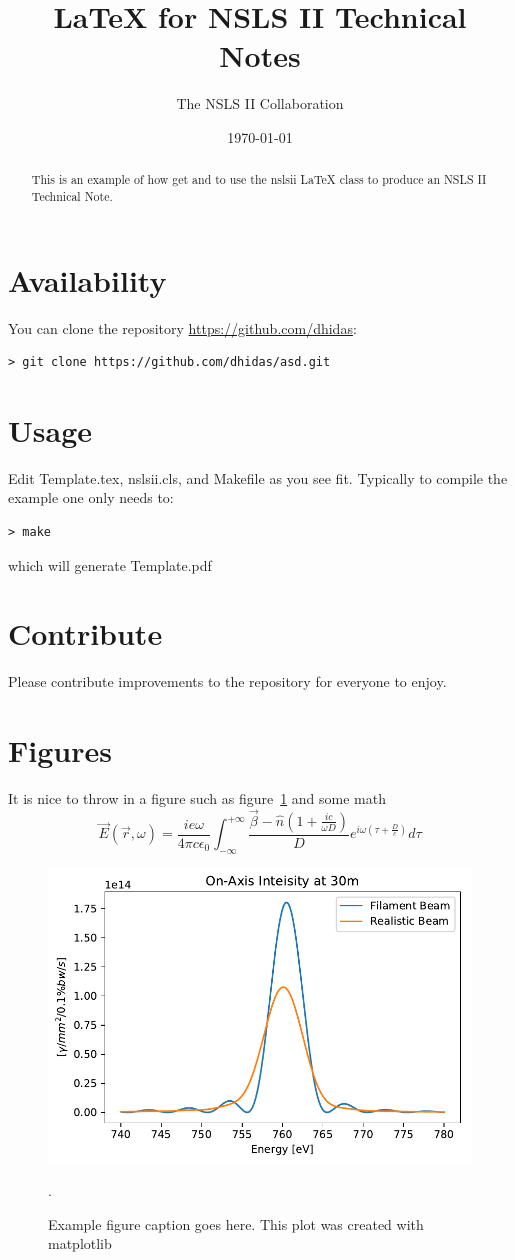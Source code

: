 \documentclass{nslsii}
\title{\LaTeX{}  for NSLS II Technical Notes}
\author{The NSLS II Collaboration}
\date{\today}
\begin{document}
\maketitle

\begin{abstract}
This is an example of how get and to use the nslsii \LaTeX{} class to produce an NSLS II Technical Note.
\end{abstract}



\section{Availability}
You can clone the repository \href{https://github.com/dhidas}{https://github.com/dhidas}:
\begin{verbatim}
> git clone https://github.com/dhidas/asd.git
\end{verbatim}

\section{Usage}
Edit Template.tex, nslsii.cls, and Makefile as you see fit.  Typically to compile the example one only needs to:
\begin{verbatim}
> make
\end{verbatim}
which will generate Template.pdf


\section{Contribute}
Please contribute improvements to the repository for everyone to enjoy.


\section{Figures}
It is nice to throw in a figure such as figure~\ref{fig:example} and some math
$$
\vec E(\vec r, \omega) = \frac{ie\omega}{4 \pi c \epsilon_0} \int_{-\infty}^{+\infty} \frac{\vec \beta - \hat n (1 + \frac{i c}{ \omega D})}{D} e^{i \omega ( \tau + \frac{D}{c} )} d\tau
$$

\begin{figure}
\centering
\includegraphics[width=0.5\columnwidth]{img/spectra}
\caption{Example figure caption goes here.  This plot was created with matplotlib~\cite{bib:matplotlib}}.
\label{fig:example}
\end{figure}
\end{document}
